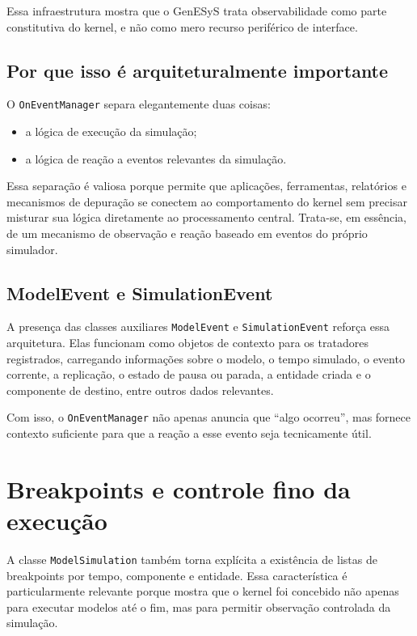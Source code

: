 Essa infraestrutura mostra que o GenESyS trata observabilidade como parte constitutiva do kernel, e não como mero recurso periférico de interface.

\subsection{Por que isso é arquiteturalmente importante}
\label{subsec:cap7_por_que_oneventmanager_importante}

O \texttt{OnEventManager} separa elegantemente duas coisas:
\begin{itemize}
    \item a lógica de execução da simulação;
    \item a lógica de reação a eventos relevantes da simulação.
\end{itemize}

Essa separação é valiosa porque permite que aplicações, ferramentas, relatórios e mecanismos de depuração se conectem ao comportamento do kernel sem precisar misturar sua lógica diretamente ao processamento central. Trata-se, em essência, de um mecanismo de observação e reação baseado em eventos do próprio simulador.

\subsection{ModelEvent e SimulationEvent}
\label{subsec:cap7_modelevent_simulationevent}

A presença das classes auxiliares \texttt{ModelEvent} e \texttt{SimulationEvent} reforça essa arquitetura. Elas funcionam como objetos de contexto para os tratadores registrados, carregando informações sobre o modelo, o tempo simulado, o evento corrente, a replicação, o estado de pausa ou parada, a entidade criada e o componente de destino, entre outros dados relevantes.

Com isso, o \texttt{OnEventManager} não apenas anuncia que ``algo ocorreu'', mas fornece contexto suficiente para que a reação a esse evento seja tecnicamente útil.

\section{Breakpoints e controle fino da execução}
\label{sec:cap7_breakpoints_controle_fino_execucao}

A classe \texttt{ModelSimulation} também torna explícita a existência de listas de breakpoints por tempo, componente e entidade. Essa característica é particularmente relevante porque mostra que o kernel foi concebido não apenas para executar modelos até o fim, mas para permitir observação controlada da simulação.

